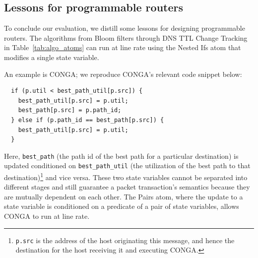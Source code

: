 \subsection{Lessons for programmable routers}
\label{ss:lessons}

To conclude our evaluation, we distill some lessons for designing programmable
routers.
 The algorithms from Bloom filters through DNS TTL Change Tracking
in Table~\ref{tab:algo_atoms} can run at line rate using the Nested Ifs atom
that modifies a single state variable.

An example is CONGA; we reproduce CONGA's relevant code snippet below:
\begin{verbatim}
  if (p.util < best_path_util[p.src]) {
    best_path_util[p.src] = p.util;
    best_path[p.src] = p.path_id;
  } else if (p.path_id == best_path[p.src]) {
    best_path_util[p.src] = p.util;
  }
\end{verbatim}
Here, \texttt{best\_path} (the path id of the best path for a particular
destination) is updated conditioned on \texttt{best\_path\_util} (the
utilization of the best path to that destination)\footnote{{\tt p.src} is the
address of the host originating this message, and hence the destination for the
host receiving it and executing CONGA.} and vice versa. These two state
variables cannot be separated into different stages and still guarantee a
packet transaction's semantics because they are mutually dependent on each
other.  The Pairs atom, where the update to a state variable is conditioned on
a predicate of a pair of state variables, allows CONGA to run at line rate.


